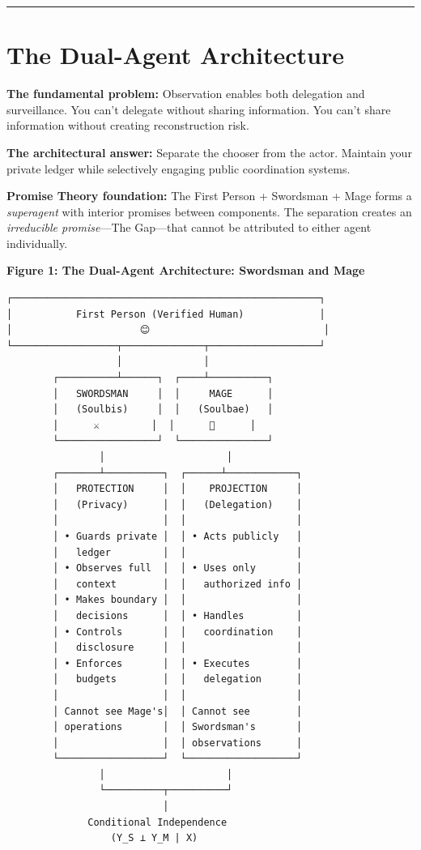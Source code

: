 \documentclass[
]{article}
\begin{document}
\begin{center}\rule{0.5\linewidth}{0.5pt}\end{center}

\section{The Dual-Agent Architecture}\label{the-dual-agent-architecture}

\textbf{The fundamental problem:} Observation enables both delegation
and surveillance. You can't delegate without sharing information. You
can't share information without creating reconstruction risk.

\textbf{The architectural answer:} Separate the chooser from the actor.
Maintain your private ledger while selectively engaging public
coordination systems.

\textbf{Promise Theory foundation:} The First Person + Swordsman + Mage
forms a \emph{superagent} with interior promises between components. The
separation creates an \emph{irreducible promise}---The Gap---that cannot
be attributed to either agent individually.

\textbf{Figure 1: The Dual-Agent Architecture: Swordsman and Mage}

\begin{verbatim}
┌─────────────────────────────────────────────────────┐
│           First Person (Verified Human)             │
│                      😊                              │
└──────────────────┬──────────────┬───────────────────┘
                   │              │
        ┌──────────┴──────┐  ┌────┴──────────┐
        │   SWORDSMAN     │  │     MAGE      │
        │   (Soulbis)     │  │   (Soulbae)   │
        │      ⚔️         │  │      🧙      │
        └─────────────────┘  └───────────────┘
                │                     │
        ┌───────┴──────────┐  ┌──────┴────────────┐
        │   PROTECTION     │  │    PROJECTION     │
        │   (Privacy)      │  │   (Delegation)    │
        │                  │  │                   │
        │ • Guards private │  │ • Acts publicly   │
        │   ledger         │  │                   │
        │ • Observes full  │  │ • Uses only       │
        │   context        │  │   authorized info │
        │ • Makes boundary │  │                   │
        │   decisions      │  │ • Handles         │
        │ • Controls       │  │   coordination    │
        │   disclosure     │  │                   │
        │ • Enforces       │  │ • Executes        │
        │   budgets        │  │   delegation      │
        │                  │  │                   │
        │ Cannot see Mage's│  │ Cannot see        │
        │ operations       │  │ Swordsman's       │
        │                  │  │ observations      │
        └──────────────────┘  └───────────────────┘
                │                     │
                └──────────┬──────────┘
                           │
              Conditional Independence
                  (Y_S ⊥ Y_M | X)
\end{verbatim}
\end{document}
